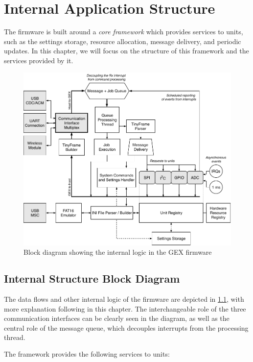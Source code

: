 \chapter{Internal Application Structure} \label{sec:coreframework}

The firmware is built around a \textit{core framework} which provides services to units, such as the settings storage, resource allocation, message delivery, and periodic updates. In this chapter, we will focus on the structure of this framework and the services provided by it.

\begin{figure}[h]
	\centering
	\includegraphics[width=\textwidth] {img/gex-internal.pdf}
	\caption{\label{fig:gex_internal}Block diagram showing the internal logic in the GEX firmware}
\end{figure}

\section{Internal Structure Block Diagram}

The data flows and other internal logic of the firmware are depicted in \cref{fig:gex_internal}, with more explanation following in this chapter. The interchangeable role of the three communication interfaces can be clearly seen in the diagram, as well as the central role of the message queue, which decouples interrupts from the processing thread.

\noindent
The framework provides the following services to units:

